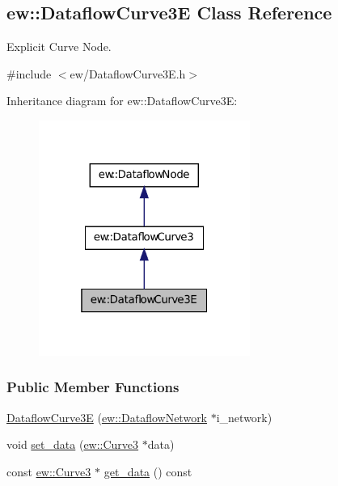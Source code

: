 \hypertarget{classew_1_1DataflowCurve3E}{
\subsection{ew::DataflowCurve3E Class Reference}
\label{classew_1_1DataflowCurve3E}
}


Explicit Curve Node.  




{\ttfamily \#include $<$ew/DataflowCurve3E.h$>$}



Inheritance diagram for ew::DataflowCurve3E:
\nopagebreak
\begin{figure}[H]
\begin{center}
\leavevmode
\includegraphics[width=196pt]{classew_1_1DataflowCurve3E__inherit__graph}
\end{center}
\end{figure}
\subsubsection*{Public Member Functions}
\begin{DoxyCompactItemize}
\item 
\hyperlink{classew_1_1DataflowCurve3E_acf5061729d97743dfd2eca60bec86956}{DataflowCurve3E} (\hyperlink{classew_1_1DataflowNetwork}{ew::DataflowNetwork} $\ast$i\_\-network)
\item 
void \hyperlink{classew_1_1DataflowCurve3E_a3e28251e9ceba31390f52e7eb259e463}{set\_\-data} (\hyperlink{classew_1_1Curve3}{ew::Curve3} $\ast$data)
\item 
const \hyperlink{classew_1_1Curve3}{ew::Curve3} $\ast$ \hyperlink{classew_1_1DataflowCurve3E_a6e3cd74e6761953a11fb5a19375abc13}{get\_\-data} () const 
\end{DoxyCompactItemize}



